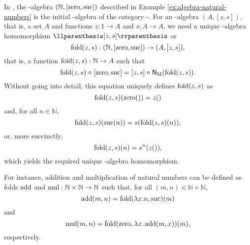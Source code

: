 \begin{example}

  \label{ex:initial-algebra-natural-numbers}


  In \set, the -algebra $(\mathbb{N},[\operatorname{zero},\operatorname{suc}])$ described
  in Example \ref{ex:algebra-natural-numbers} is the initial
  -algebra of the category -\alg. For an
  -algebra $(A,[z,s])$, that is, a set $A$ and functions $z: 1
  \to A$ and $s: A \to A$, we need a unique -algebra
  homomorphism $\cata{[z,s]}$ or
  \begin{equation*}
    \operatorname{fold}(z,s): (\mathbb{N},[\operatorname{zero},\operatorname{suc}]) \to (A,[z,s])
    \text{,}
  \end{equation*}
  that is, a function $\operatorname{fold}(z,s): \mathbb{N} \to A$ such that
  \begin{equation*}
    \operatorname{fold}(z,s) \mathrel{\circ} [\operatorname{zero},\operatorname{suc}] = [z,s] \mathrel{\circ} \mathsf{N}_{\operatorname{M}}(\operatorname{fold}(z,s))
    \text{.}
  \end{equation*}
  Without going into detail, this equation uniquely defines
  $\operatorname{fold}(z,s)$ as
  \begin{equation*}
    \operatorname{fold}(z,s)(\operatorname{zero}()) = z()
  \end{equation*}
  and, for all $n \in \mathbb{N}$,
  \begin{equation*}
    \operatorname{fold}(z,s)(\operatorname{suc}(n)) = s(\operatorname{fold}(z,s)(n))
    \text{,}
  \end{equation*}
  or, more succinctly,
  \begin{equation*}
    \operatorname{fold}(z,s)(n) = s^{n}(z())
    \text{,}
  \end{equation*}
  which yields the required unique -algebra homomorphism.

  For instance, addition and multiplication of natural numbers can be
  defined as folds $\operatorname{add}$ and $\operatorname{mul}: \mathbb{N} \times \mathbb{N} \to
  \mathbb{N}$ such that, for all $(m,n) \in \mathbb{N} \times
  \mathbb{N}$,
  \begin{equation*}
    \operatorname{add}(m,n) = \operatorname{fold}(\lambda x.n,\operatorname{suc})(m)
  \end{equation*}
  and
  \begin{equation*}
    \operatorname{mul}(m,n) = \operatorname{fold}(\operatorname{zero},\lambda x.\operatorname{add}(m,x))(m)
    \text{,}
  \end{equation*}
  respectively.

\end{example}

